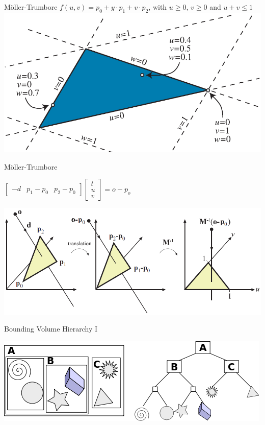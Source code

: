 \documentclass[xcolor=table]{beamer}
\begin{document}
\begin{frame}{Möller-Trumbore}
	$f(u,v) = p_0 + y \cdot p_1 + v \cdot p_2$, with $u \geq 0$, $v \geq 0$	and $u+v \leq 1$
	\includegraphics[scale=0.30]{media/barycentric.png}

\end{frame}

\begin{frame}{Möller-Trumbore}

	$\begin{bmatrix}
		-d & p_1 - p_0 & p_2 - p_0	
	\end{bmatrix}
	\begin{bmatrix}
	t \\ u \\ v
	\end{bmatrix}
	= o - p_o
	$
	
	\includegraphics[scale=0.30]{media/transform.png}

\end{frame}

\begin{frame}{Bounding Volume Hierarchy I}

\includegraphics[scale=0.5]{media/BVH_example.png}

\end{frame}
\end{document}
